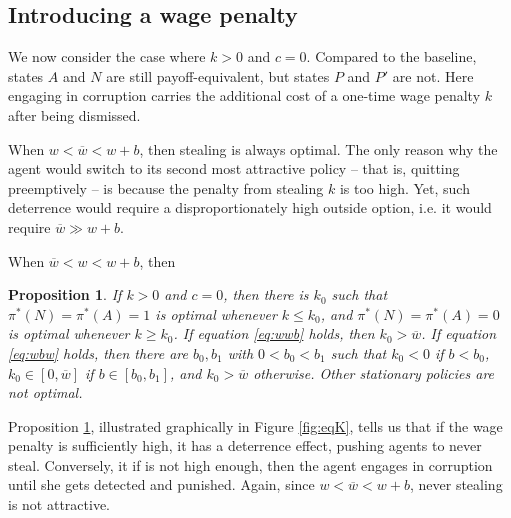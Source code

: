 \documentclass[12pt,a4paper]{article}
\newtheorem{proposition}{Proposition}
\theoremstyle{definition}
\newcommand{\wb}{\overline{w}}
\begin{document}
{\subsection{Introducing a wage penalty}

We now consider the case where $k > 0$ and $c = 0$. Compared to the baseline, states $A$ and $N$ are still payoff-equivalent, but states $P$ and $P'$ are not. Here engaging in corruption carries the additional cost of a one-time wage penalty $k$ after being dismissed. 

When $w < \wb < w+b$, then stealing is always optimal. The only reason why the agent would switch to its second most attractive policy -- that is, quitting preemptively -- is because the penalty from stealing $k$ is too high. Yet, such deterrence would require a disproportionately high outside option, i.e. it would require $\wb \gg w+b$. 

When $\wb < w < w+b$, then 
\begin{proposition}
    \label{prop:eqK}
    If $k > 0$ and $c = 0$, then there is $k_0$ such that $\pi^*(N)=\pi^*(A)=1$ is optimal whenever $k \leq k_0$, and $\pi^*(N)=\pi^*(A)=0$ is optimal whenever $k \geq k_0$. If equation \ref{eq:wwb} holds, then $k_0 > \wb$. If equation \ref{eq:wbw} holds, then there are $b_0, b_1$ with $0 < b_0 < b_1$ such that $k_0 < 0$ if $b < b_0$, $k_0 \in [0,\wb]$ if $b \in [b_0, b_1]$, and $k_0 > \wb$ otherwise. Other stationary policies are not optimal. 
\end{proposition}
Proposition \ref{prop:eqK}, illustrated graphically in Figure \ref{fig:eqK}, tells us that if the wage penalty is sufficiently high, it has a deterrence effect, pushing agents to never steal. Conversely, it if is not high enough, then the agent engages in corruption until she gets detected and punished. Again, since $w < \wb < w+b$, never stealing is not attractive. 

}
\end{document}
